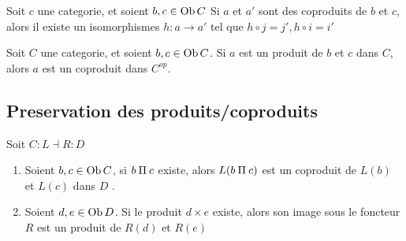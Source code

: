 \documentclass[../main.tex]{subfiles}
\begin{document}
\begin{lemma}
Soit $c$ une categorie, et soient $b,c \in \operatorname{Ob} C$ Si $a$ et $a'$ sont des coproduits de $b$ et $c$, alors il existe un isomorphismes $h : a \to a'$ tel que $h \circ j = j', h\circ i = i'$ 
\end{lemma}
\begin{rmq}
	Soit $C$ une categorie, et soient $b,c \in \operatorname{Ob} C$. Si $a$ est un produit de $b$ et $c$ dans $C$, alors $a$ est un coproduit dans $C^{op}$.
\end{rmq}
\subsection{Preservation des produits/coproduits}
\begin{propo}
	Soit $C: L \dashv R: D$ 
\begin{enumerate}
	\item Soient $b,c \in \operatorname{Ob} C$, si $b\mathbin{\Pi} c$ existe, alors $L( b\mathbin{\Pi} c) $ est un coproduit de $L( b) $ et $L( c) $ dans $D$ .
	\item Soient $d,e \in \operatorname{Ob} D$. Si le produit $d\times e $ existe, alors son image sous le foncteur $R$ est un produit de $R( d) $ et $R( e ) $ 
\end{enumerate}
\end{propo}
\end{document}
